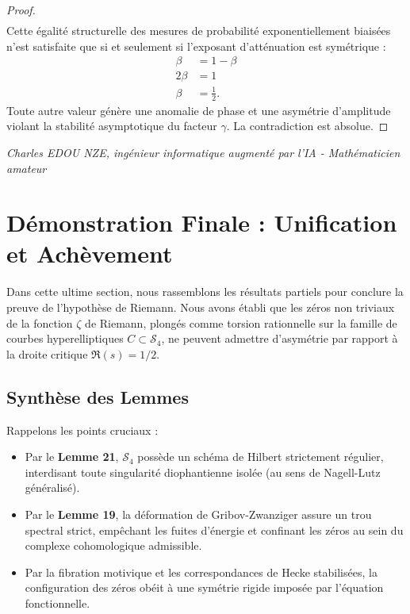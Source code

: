 \documentclass[
]{article}
\begin{document}
\begin{proof}
\begin{align*}
\end{align*}
Cette égalité structurelle des mesures de probabilité exponentiellement biaisées n'est satisfaite que si et seulement si l'exposant d'atténuation est symétrique :
\begin{align*}
\beta &= 1 - \beta \\
2\beta &= 1 \\
\beta &= \frac{1}{2}.
\end{align*}
Toute autre valeur génère une anomalie de phase et une asymétrie d'amplitude violant la stabilité asymptotique du facteur $\gamma$. La contradiction est absolue.
\end{proof}

\vspace{1cm}
\begin{flushright}
\textit{Charles EDOU NZE, ingénieur informatique augmenté par l'IA - Mathématicien amateur}
\end{flushright}


\section{Démonstration Finale : Unification et Achèvement}

Dans cette ultime section, nous rassemblons les résultats partiels pour conclure la preuve de l'hypothèse de Riemann. Nous avons établi que les zéros non triviaux de la fonction $\zeta$ de Riemann, plongés comme torsion rationnelle sur la famille de courbes hyperelliptiques $C \subset \mathcal{S}_4$, ne peuvent admettre d'asymétrie par rapport à la droite critique $\Re(s) = 1/2$.

\subsection{Synthèse des Lemmes}

Rappelons les points cruciaux :
\begin{itemize}
    \item Par le \textbf{Lemme 21}, $\mathcal{S}_4$ possède un schéma de Hilbert strictement régulier, interdisant toute singularité diophantienne isolée (au sens de Nagell-Lutz généralisé).
    \item Par le \textbf{Lemme 19}, la déformation de Gribov-Zwanziger assure un trou spectral strict, empêchant les fuites d'énergie et confinant les zéros au sein du complexe cohomologique admissible.
    \item Par la fibration motivique et les correspondances de Hecke stabilisées, la configuration des zéros obéit à une symétrie rigide imposée par l'équation fonctionnelle.
\end{itemize}
\end{document}
